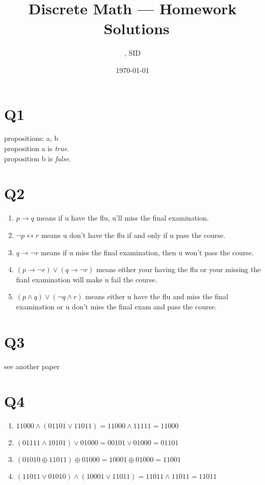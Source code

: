 \documentclass[11pt]{article}
\title{Discrete Math --- Homework \Homework \ Solutions}
\author{\Name, SID \SID}
\date{\today}
\newenvironment{qparts}{\begin{enumerate}[{(}a{)}]}{\end{enumerate}}
\begin{document}
\maketitle

\section*{Q1}
propositions: a, b \\
proposition a is \emph{true}. \\
proposition b is \emph{false}.


\section*{Q2}
\begin{qparts}
\item 
$p\to q$ means 
if u have the flu, u'll miss the final examination.

\item 
$\lnot p \leftrightarrow r$ means 
u don't have the flu if and 
only if u pass the course.


\item 
$q\to \lnot r$ means 
if u miss the final examination, then u won't 
pass the course.


\item 
$(p \to  \lnot r) \lor (q \to  \lnot r)$ means 
either your having the flu or your missing the fianl examination 
will make u fail the course.


\item 
$(p \land q)\lor (\lnot q \land r)$ means 
either u have the flu and miss the final examination
or u don't miss the final exam and pass the course.

\end{qparts}

\section*{Q3}
see another paper

\section*{Q4}
\begin{qparts}

    \item 
    $11000 \land (01101 \lor 11011)=11000 \land 11111=11000$
    
    \item 
    $(01111\land 10101)\lor 01000=00101\lor 01000=01101$
    
    \item 
    $(01010 \oplus 11011) \oplus 01000=10001 \oplus 01000=11001$

    \item 
    $(11011 \lor 01010)\land (10001 \lor 11011)=11011 \land 11011=11011$
    \end{qparts}
    
\end{document}
